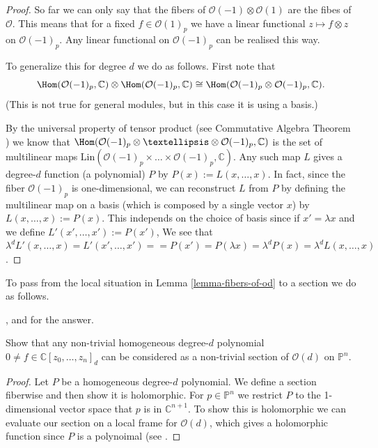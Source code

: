 \documentclass{book}
\begin{document}
\begin{proof}
So far we can only say that the fibers of
$\mathcal{O}(-1)\otimes \mathcal{O}(1)$ are
the fibes of $\mathcal{O}$.
This means that for a fixed $f \in
\mathcal{O}(1)_p$
we have a linear functional $z \mapsto
f\otimes z$
on $\mathcal{O}(-1)_p$. Any linear functional
on $\mathcal{O}(-1)_p$
can be realised this way.

To generalize this for degree $d$ we do as
follows.
First note that
$$
\Hom(\mathcal{O}(-1)_p,\mathbb{C})
\otimes\Hom(\mathcal{O}(-1)_p,\mathbb{C})
\cong
\Hom(\mathcal{O}(-1)_p\otimes\mathcal{O}(-1)
_p,\mathbb{C}).
$$
(This is not true for general modules,
but in this case it is using a basis.)

By the universal property of tensor product
(see Commutative Algebra Theorem
\cite{theorem-unive-prope-tenso-produ})
we know that
$\Hom(\mathcal{O}(-1)_p \otimes … \otimes
\mathcal{O}(-1)_p,\mathbb{C})$
is the set of multilinear maps
$\text{Lin}(\mathcal{O}(-1)_p
\times…\times\mathcal{O}(-1)_p,\mathbb{C})$.
Any such map $L$ gives a degree-$d$ function
(a polynomial) $P$ by
$P(x):=L(x,…,x)$.
In fact, since the fiber $\mathcal{O}(-1)_p$
is one-dimensional,
we can reconstruct $L$ from $P$ by defining
the multilinear map on a basis (which is
composed by a single vector $x$)
by $L(x,…,x):=P(x)$. This independs on the
choice
of basis since if $x'=\lambda x$ and we
define $L'(x',…,x'):=P(x')$,
We see that $\lambda^d L'(x,…,x)=L'(x',…,x')=
=P(x')=P(\lambda x)=\lambda^d P(x)=\lambda^d
L(x,…,x)$.
\end{proof}

\noindent
To pass from the local situation in Lemma
\ref{lemma-fibers-of-od}
to a section we do as follows.

\begin{exercise}
\label{exercise-polynomials-are-sections}
\begin{reference}
\cite[Exercise 2.2.8]{huc}, and
\cite[Lemma 3.30]{lec} for the answer.
\end{reference}
Show that any non-trivial homogeneous
degree-$d$ polynomial $0 \neq f \in
\mathbb{C}[z_0,…,z_n]_d$ can be considered as
a non-trivial section of $\mathcal{O}(d)$ on
$\mathbb{P}^n$.
\end{exercise}

\begin{proof}
Let $P$ be a homogeneous degree-$d$
polynomial. We define a section fiberwise and
then show it is holomorphic. For $p \in
\mathbb{P}^n$ we restrict $P$ to the
1-dimensional vector space that $p$ is in
$\mathbb{C}^{n+1}$. To show this is
holomorphic we can evaluate our section on a
local frame for $\mathcal{O}(d)$, which gives
a holomorphic function since $P$ is a
polynoimal (see \cite[Proposition 3.35]{lec}.
\end{proof}
\end{document}
